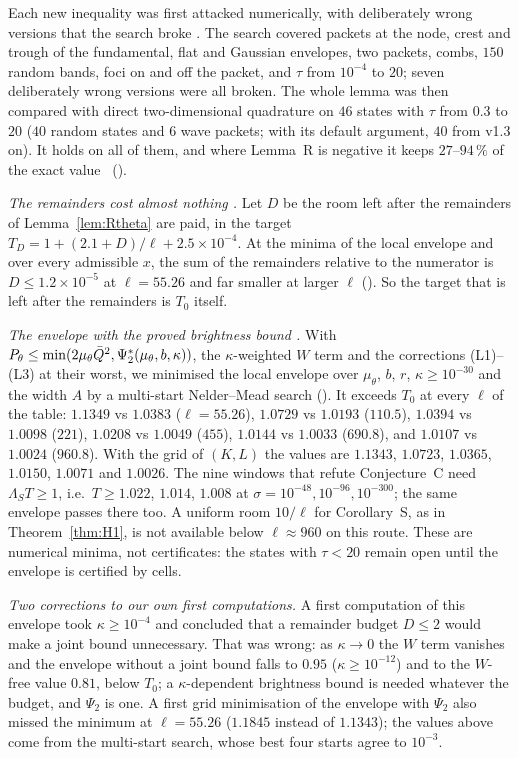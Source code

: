 Each new inequality was first attacked numerically, with deliberately wrong versions that the search broke \numst.
The search covered packets at the node, crest and trough of the fundamental, flat and Gaussian envelopes, two packets, combs, $150$ random bands, foci on and off the packet, and $\tau$ from $10^{-4}$ to $20$; seven deliberately wrong versions were all broken.
The whole lemma was then compared with direct two-dimensional quadrature on $46$ states with $\tau$ from $0.3$ to $20$ ($40$ random states and $6$ wave packets;  with its default argument, $40$ from v1.3 on).
It holds on all of them, and where Lemma~R is negative it keeps $27$--$94\,\%$ of the exact value \numst\ ().

\emph{The remainders cost almost nothing \numst.}
Let $D$ be the room left after the remainders of Lemma~\ref{lem:Rtheta} are paid, in the target $T_D=1+(2.1+D)/\ell+2.5\times10^{-4}$.
At the minima of the local envelope and over every admissible $x$, the sum of the remainders relative to the numerator is $D\le1.2\times10^{-5}$ at $\ell=55.26$ and far smaller at larger $\ell$ ().
So the target that is left after the remainders is $T_0$ itself.

\emph{The envelope with the proved brightness bound \numst.}
With $P_\theta\le\min(2\mu_\theta\bar Q^2,\Psi_2^*(\mu_\theta,b,\kappa))$, the $\kappa$-weighted $W$ term and the corrections (L1)--(L3) at their worst, we minimised the local envelope over $\mu_\theta$, $b$, $r$, $\kappa\ge10^{-30}$ and the width $A$ by a multi-start Nelder--Mead search ().
It exceeds $T_0$ at every $\ell$ of the table:
$1.1349$ vs $1.0383$ ($\ell=55.26$), $1.0729$ vs $1.0193$ ($110.5$), $1.0394$ vs $1.0098$ ($221$), $1.0208$ vs $1.0049$ ($455$), $1.0144$ vs $1.0033$ ($690.8$), and $1.0107$ vs $1.0024$ ($960.8$).
With the grid of $(K,L)$ the values are $1.1343$, $1.0723$, $1.0365$, $1.0150$, $1.0071$ and $1.0026$.
The nine windows that refute Conjecture~C need $\Lambda_ST\ge1$, i.e.\ $T\ge1.022$, $1.014$, $1.008$ at $\sigma=10^{-48},10^{-96},10^{-300}$; the same envelope passes there too.
A uniform room $10/\ell$ for Corollary~S, as in Theorem~\ref{thm:H1}, is not available below $\ell\approx960$ on this route.
These are numerical minima, not certificates: the states with $\tau<20$ remain open until the envelope is certified by cells.

\emph{Two corrections to our own first computations.}
A first computation of this envelope took $\kappa\ge10^{-4}$ and concluded that a remainder budget $D\le2$ would make a joint bound unnecessary.
That was wrong: as $\kappa\to0$ the $W$ term vanishes and the envelope without a joint bound falls to $0.95$ ($\kappa\ge10^{-12}$) and to the $W$-free value $0.81$, below $T_0$; a $\kappa$-dependent brightness bound is needed whatever the budget, and $\Psi_2$ is one.
A first grid minimisation of the envelope with $\Psi_2$ also missed the minimum at $\ell=55.26$ ($1.1845$ instead of $1.1343$); the values above come from the multi-start search, whose best four starts agree to $10^{-3}$.

